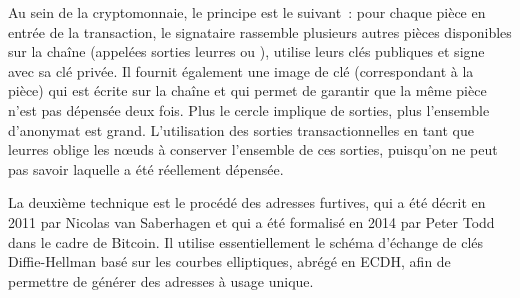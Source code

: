 Au sein de la cryptomonnaie, le principe est le suivant~: pour chaque pièce en entrée de la transaction, le signataire rassemble plusieurs autres pièces disponibles sur la chaîne (appelées sorties leurres ou ), utilise leurs clés publiques et signe avec sa clé privée. Il fournit également une image de clé (correspondant à la pièce) qui est écrite sur la chaîne et qui permet de garantir que la même pièce n'est pas dépensée deux fois. Plus le cercle implique de sorties, plus l'ensemble d'anonymat est grand. L'utilisation des sorties transactionnelles en tant que leurres oblige les nœuds à conserver l'ensemble de ces sorties, puisqu'on ne peut pas savoir laquelle a été réellement dépensée.



La deuxième technique est le procédé des adresses furtives, qui a été décrit en 2011 par Nicolas van Saberhagen et qui a été formalisé en 2014 par Peter Todd dans le cadre de Bitcoin. Il utilise essentiellement le schéma d’échange de clés Diffie-Hellman basé sur les courbes elliptiques, abrégé en ECDH, afin de permettre de générer des adresses à usage unique.

